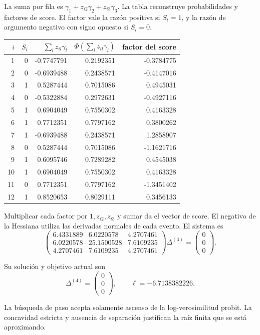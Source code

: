 \documentclass[11pt,a4paper]{article}
\begin{document}
La suma por fila es
\(\gamma_1+z_{i2}\gamma_2+z_{i3}\gamma_3\).
La tabla reconstruye probabilidades
y factores de score.
El factor vale la razón
positiva si \(S_i=1\),
y la razón de argumento
negativo con signo opuesto
si \(S_i=0\).
\begin{center}\small\begin{tabular}{rrrrr}\toprule
\(i\)&\(S_i\)&\(\sum_lz_{il}\gamma_l\)&\(\Phi(\sum_lz_{il}\gamma_l)\)&factor del score\\\midrule
1&0&-0.7747791&0.2192351&-0.3784775\\
2&0&-0.6939488&0.2438571&-0.4147016\\
3&1&0.5287444&0.7015086&0.4945031\\
4&0&-0.5322884&0.2972631&-0.4927116\\
5&1&0.6904049&0.7550302&0.4163328\\
6&1&0.7712351&0.7797162&0.3800262\\
7&1&-0.6939488&0.2438571&1.2858907\\
8&0&0.5287444&0.7015086&-1.1621716\\
9&1&0.6095746&0.7289282&0.4545038\\
10&1&0.6904049&0.7550302&0.4163328\\
11&0&0.7712351&0.7797162&-1.3451402\\
12&1&0.8520653&0.8029111&0.3456133\\\bottomrule\end{tabular}\end{center}
Multiplicar cada factor por
\(1,z_{i2},z_{i3}\)
y sumar da el vector
de score.
El negativo de la Hessiana
utiliza las derivadas
normales de cada evento.
El sistema es
\[
\begin{pmatrix}6.4331889&6.0220578&4.2707461\\6.0220578&25.1500528&7.6109235\\4.2707461&7.6109235&4.2707461\end{pmatrix}\Delta^{(4)}=\begin{pmatrix}0\\0\\0\end{pmatrix}.
\]

Su solución y objetivo actual son
\[
\Delta^{(4)}=\begin{pmatrix}0\\0\\0\end{pmatrix},\qquad\ell=-6.7138382226.
\]

La búsqueda de paso
acepta solamente ascenso
de la log-verosimilitud probit.
La concavidad estricta y
ausencia de separación
justifican la raíz finita
que se está aproximando.
\end{document}
